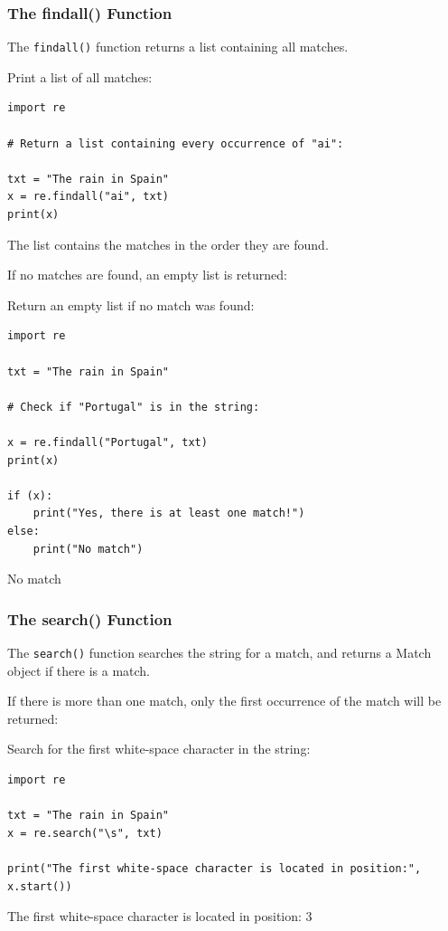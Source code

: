 \documentclass[12pt,a4paper]{article}
\newcommand{\code}[1]{%
	\colorbox{backcolour}{\lstinline{#1}}%
}
\begin{document}
\subsubsection{The findall() Function}

The \code{findall()} function returns a list containing all matches.

\begin{ebox}
Print a list of all matches:
	\begin{lstlisting}
import re

# Return a list containing every occurrence of "ai":

txt = "The rain in Spain"
x = re.findall("ai", txt)
print(x)
	\end{lstlisting}
\tcblower
	\begin{vercode}
['ai', 'ai']
	\end{vercode}
\end{ebox}

The list contains the matches in the order they are found.

If no matches are found, an empty list is returned:

\begin{ebox}
Return an empty list if no match was found:
	\begin{lstlisting}
import re

txt = "The rain in Spain"

# Check if "Portugal" is in the string:

x = re.findall("Portugal", txt)
print(x)

if (x):
    print("Yes, there is at least one match!")
else:
    print("No match")
	\end{lstlisting}
\tcblower
	\begin{vercode}
[]
No match
	\end{vercode}
\end{ebox}
\subsubsection{The search() Function}

The \code{search()} function searches the string for a match, and returns a
Match object if there is a match.

If there is more than one match, only the first occurrence of the match will be returned:

\begin{ebox}
Search for the first white-space character in the string:
	\begin{lstlisting}
import re

txt = "The rain in Spain"
x = re.search("\s", txt)

print("The first white-space character is located in position:", x.start())
	\end{lstlisting}
\tcblower
	\begin{vercode}
The first white-space character is located in position: 3
	\end{vercode}
\end{ebox}
\end{document}
